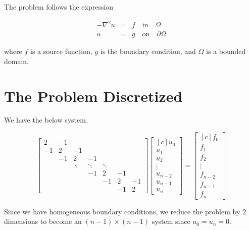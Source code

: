 \documentclass[fontsize=11pt,paper=a4,titlepage]{article}
\begin{document}
The problem follows the expression

\begin{eqnarray}
	-\nabla^2 u & = & f \quad \textrm{in} \quad \Omega \\
	u & = & g \quad \textrm{on} \quad \partial\Omega
	\label{eq:Poisson}
\end{eqnarray}

where $f$ is a source function, $g$ is the boundary condition, and $\Omega$ is a
bounded domain.

\section{The Problem Discretized}
\label{sec:Prob-Discr}

We have the below system.

\begin{displaymath}
\begin{bmatrix}
	2 & -1 &  &  &  &  &  \\
	-1 & 2 & -1 &  &  &  &  \\
	 & -1 & 2 & -1 &  &  &  \\
	 &  & \ddots & \ddots & \ddots &  & \\
	 &  &  & -1 & 2 & -1 &  \\
	 &  &  &  & -1 & 2 & -1 \\
	 &  &  &  &  & -1 & 2
\end{bmatrix}
\begin{bmatrix*}[c]
	u_0 \\
	u_1 \\
	u_2 \\
	\vdots \\
	u_{n - 2} \\
	u_{n - 1} \\
	u_n
\end{bmatrix*}
=
\begin{bmatrix*}[c]
	f_0 \\
	f_1 \\
	f_2 \\
	\vdots \\
	f_{n - 2} \\
	f_{n - 1} \\
	f_n
\end{bmatrix*}
\end{displaymath}

Since we have homogeneous boundary conditions, we reduce the problem by $2$
dimensions to become an $(n - 1) \times (n - 1)$ system since $u_0 = u_n = 0$.
\end{document}

